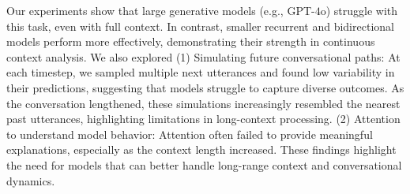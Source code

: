 Our experiments show that large generative models (e.g., GPT-$4$o) struggle with this task, even with full context.
%
In contrast, smaller recurrent and bidirectional models perform more effectively, demonstrating their strength in continuous context analysis.
%
We also explored
%
(1) Simulating future conversational paths: At each timestep, we sampled multiple next utterances and found low variability in their predictions, suggesting that models struggle to capture diverse outcomes.
%
As the conversation lengthened, these simulations increasingly resembled the nearest past utterances, highlighting limitations in long-context processing.
%
(2) Attention to understand model behavior: Attention often failed to provide meaningful explanations, especially as the context length increased.
%
These findings highlight the need for models that can better handle long-range context and conversational dynamics.

